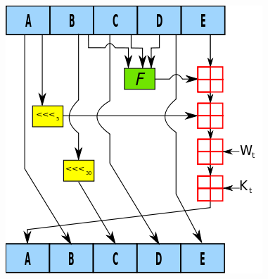 \documentclass[10pt,a4paper]{article}
\begin{document}
\begin{figure}[htbp]
\includegraphics[scale=0.6]{immagini/sha-1.png}
\end{figure}
\end{document}

